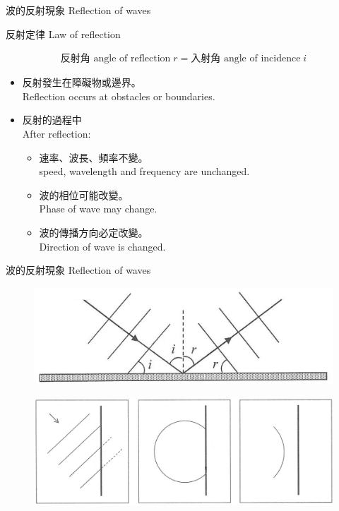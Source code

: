 \documentclass[beamer=true]{standalone}
\begin{document}
\begin{frame}{波的反射現象 Reflection of waves}
    \begin{exampleblock}{反射定律 Law of reflection}

        \begin{align*}
            \textrm{反射角 angle of reflection} \;r = \textrm{入射角 angle of incidence} \; i
        \end{align*}
    \end{exampleblock}
    \begin{itemize}
        \item 反射發生在障礙物或邊界。\\Reflection occurs at obstacles or boundaries.
        \item 反射的過程中\\After reflection:
              \begin{itemize}
                  \item 速率、波長、頻率不變。\\speed, wavelength and frequency are unchanged.
                  \item 波的相位可能改變。\\Phase of wave may change.
                  \item 波的傳播方向必定改變。\\Direction of wave is changed.
              \end{itemize}
    \end{itemize}

\end{frame}


\begin{frame}{波的反射現象 Reflection of waves}
    \begin{figure}
        \centering
        \includegraphics[width=0.5\linewidth]{images/Screenshot_21.png}
    \end{figure}\bigskip
    \begin{figure}
        \centering
        \includegraphics[width=1\linewidth]{images/Screenshot 2023-09-26 at 11.02.18 PM.png}
    \end{figure}
\end{frame}
\end{document}
